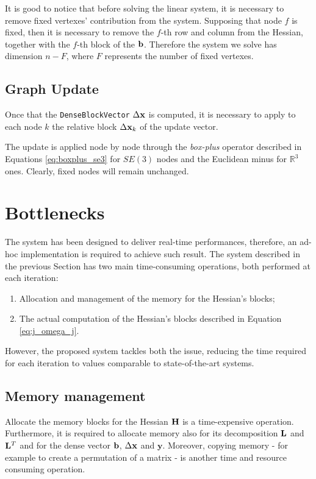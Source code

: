 It is good to notice that before solving the linear system, it is necessary to remove fixed vertexes' contribution from the system. Supposing that node $f$ is fixed, then it is necessary to remove the $f$-th row and column from the Hessian, together with the $f$-th block of the $\mathbf{b}$. Therefore the system we solve has dimension $n - F$, where $F$ represents the number of fixed vertexes.

\subsection{Graph Update}\label{subsec:update}
Once that the \texttt{DenseBlockVector} $\Delta \mathbf{x}$ is computed, it is necessary to apply to each node $k$ the relative block $\Delta \mathbf{x}_k$ of the update vector.

The update is applied node by node through the \textit{box-plus} operator described in Equations \ref{eq:boxplus_se3} for $SE(3)$ nodes and the Euclidean minus for $\mathbb{R}^3$ ones. Clearly, fixed nodes will remain unchanged. 

\section{Bottlenecks}\label{sec:bottlenecks}
The system has been designed to deliver real-time performances, therefore, an ad-hoc implementation is required to achieve such result. The system described in the previous Section has two main time-consuming operations, both performed at each iteration:

\begin{enumerate}
    \item Allocation and management of the memory for the Hessian's blocks;
    \item The actual computation of the Hessian's blocks described in Equation \ref{eq:j_omega_j}.
\end{enumerate}

However, the proposed system tackles both the issue, reducing the time required for each iteration to values comparable to state-of-the-art systems.

\subsection{Memory management}\label{subsec:memory_management}
Allocate the memory blocks for the Hessian $\mathbf{H}$ is a time-expensive operation. Furthermore, it is required to allocate memory also for its decomposition $\mathbf{L}$ and $\mathbf{L}^T$ and for the dense vector $\mathbf{b}$, $\Delta \mathbf{x}$ and $\mathbf{y}$. Moreover, copying memory - for example to create a permutation of a matrix -  is another time and resource consuming operation. 

